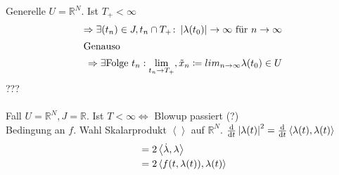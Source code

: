\documentclass[11pt, a4paper]{article}
\theoremstyle{plain}
\numberwithin{equation}{subsection}
\newcommand{\of}[1]{\mathopen{}\mathclose{}\bgroup\left(#1\aftergroup\egroup\right)}
\newcommand{\abs}[1]{\left\lvert#1\right\rvert}
\newcommand{\scalprod}[1]{\left<#1\right>}
\newcommand{\equivalent}[0]{\Leftrightarrow{}}
\newcommand{\impl}[0]{\Rightarrow{}}
\newcommand{\dif}{\mathop{}\!\mathrm{d}}
\newcommand{\toinf}{\to\infty}
\newcommand{\R}{\mathbb{R}}
\begin{document}
    Generelle $U = \R^N$. Ist $T_+ < \infty$
    \begin{align*}
        \impl \exists (t_n) \in J, t_n \cap T_+\colon \abs{\lambda\of{t_0}} \toinf\text{ für }n\toinf\\
        \intertext{Genauso}
        \impl \exists \text{Folge } t_n: \lim_{t_n \to T_+}, \tilde{x}_n \coloneqq lim_{n\toinf}\lambda\of{t_0} \in U
    \end{align*}
    ???\\~\\
    \noindent Fall $U = \R^N, J = \R$. Ist $T < \infty\equivalent$ Blowup passiert (?)\\
    Bedingung an $f$. Wahl Skalarprodukt $\scalprod{}$ auf $\R^N$. $\frac{\dif}{\dif t} \abs{\lambda\of{t}}^2 = \frac{\dif}{\dif t} \scalprod{\lambda\of{t}, \lambda\of{t}}$
    \begin{align*}
        &= 2\scalprod{\dot\lambda, \lambda}\\
        &= 2\scalprod{f\of{t, \lambda\of{t}}, \lambda\of{t}}\\
    \end{align*}
\end{document}
